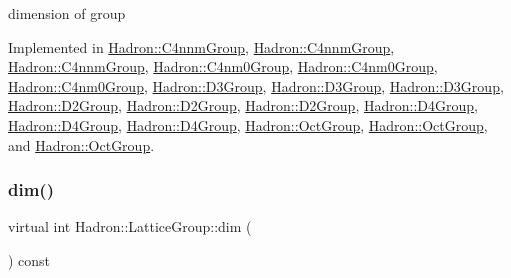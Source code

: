 dimension of group 

Implemented in \mbox{\hyperlink{structHadron_1_1C4nnmGroup_ab40f44381ee83db2364e43bc2c3521e4}{Hadron\+::\+C4nnm\+Group}}, \mbox{\hyperlink{structHadron_1_1C4nnmGroup_ab40f44381ee83db2364e43bc2c3521e4}{Hadron\+::\+C4nnm\+Group}}, \mbox{\hyperlink{structHadron_1_1C4nnmGroup_ab40f44381ee83db2364e43bc2c3521e4}{Hadron\+::\+C4nnm\+Group}}, \mbox{\hyperlink{structHadron_1_1C4nm0Group_adc1a59b08c4fafae324e82e8ded86919}{Hadron\+::\+C4nm0\+Group}}, \mbox{\hyperlink{structHadron_1_1C4nm0Group_adc1a59b08c4fafae324e82e8ded86919}{Hadron\+::\+C4nm0\+Group}}, \mbox{\hyperlink{structHadron_1_1C4nm0Group_adc1a59b08c4fafae324e82e8ded86919}{Hadron\+::\+C4nm0\+Group}}, \mbox{\hyperlink{structHadron_1_1D3Group_a90114a92f0c05cdfd8ff56e33606d3c3}{Hadron\+::\+D3\+Group}}, \mbox{\hyperlink{structHadron_1_1D3Group_a90114a92f0c05cdfd8ff56e33606d3c3}{Hadron\+::\+D3\+Group}}, \mbox{\hyperlink{structHadron_1_1D3Group_a90114a92f0c05cdfd8ff56e33606d3c3}{Hadron\+::\+D3\+Group}}, \mbox{\hyperlink{structHadron_1_1D2Group_a937ab7d9b4b21da1331b0c85728f7db9}{Hadron\+::\+D2\+Group}}, \mbox{\hyperlink{structHadron_1_1D2Group_a937ab7d9b4b21da1331b0c85728f7db9}{Hadron\+::\+D2\+Group}}, \mbox{\hyperlink{structHadron_1_1D2Group_a937ab7d9b4b21da1331b0c85728f7db9}{Hadron\+::\+D2\+Group}}, \mbox{\hyperlink{structHadron_1_1D4Group_a5969c3afe94d4c6ada166f7dc161a355}{Hadron\+::\+D4\+Group}}, \mbox{\hyperlink{structHadron_1_1D4Group_a5969c3afe94d4c6ada166f7dc161a355}{Hadron\+::\+D4\+Group}}, \mbox{\hyperlink{structHadron_1_1D4Group_a5969c3afe94d4c6ada166f7dc161a355}{Hadron\+::\+D4\+Group}}, \mbox{\hyperlink{structHadron_1_1OctGroup_a1db49add38b9263bfd536b3da0cc1566}{Hadron\+::\+Oct\+Group}}, \mbox{\hyperlink{structHadron_1_1OctGroup_a1db49add38b9263bfd536b3da0cc1566}{Hadron\+::\+Oct\+Group}}, and \mbox{\hyperlink{structHadron_1_1OctGroup_a1db49add38b9263bfd536b3da0cc1566}{Hadron\+::\+Oct\+Group}}.

\mbox{\label{structHadron_1_1LatticeGroup_abd8415698323796ef6a8605796ee3bea}} 
\subsubsection{\texorpdfstring{dim()}{dim()}\hspace{0.1cm}{\footnotesize\ttfamily [3/3]}}
{\footnotesize\ttfamily virtual int Hadron\+::\+Lattice\+Group\+::dim (\begin{DoxyParamCaption}{ }\end{DoxyParamCaption}) const\hspace{0.3cm}{\ttfamily [pure virtual]}}

